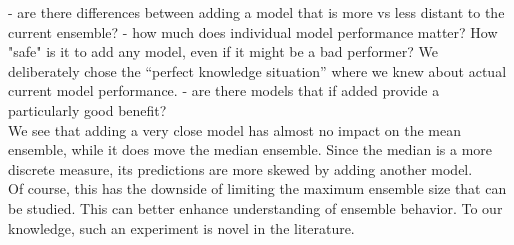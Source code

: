 - are there differences between adding a model that is more vs less distant to the current ensemble?
- how much does individual model performance matter? How "safe" is it to add any model, even if it might be a bad performer? We deliberately chose the ``perfect knowledge situation'' where we knew about actual current model performance. 
- are there models that if added provide a particularly good benefit?\\
We see that adding a very close model has almost no impact on the mean ensemble, while it does move the median ensemble. Since the median is a more discrete measure, its predictions are more skewed by adding another model. \\
Of course, this has the downside of limiting the maximum ensemble size that can be studied. This can better enhance understanding of ensemble behavior. To our knowledge, such an experiment is novel in the literature. 
